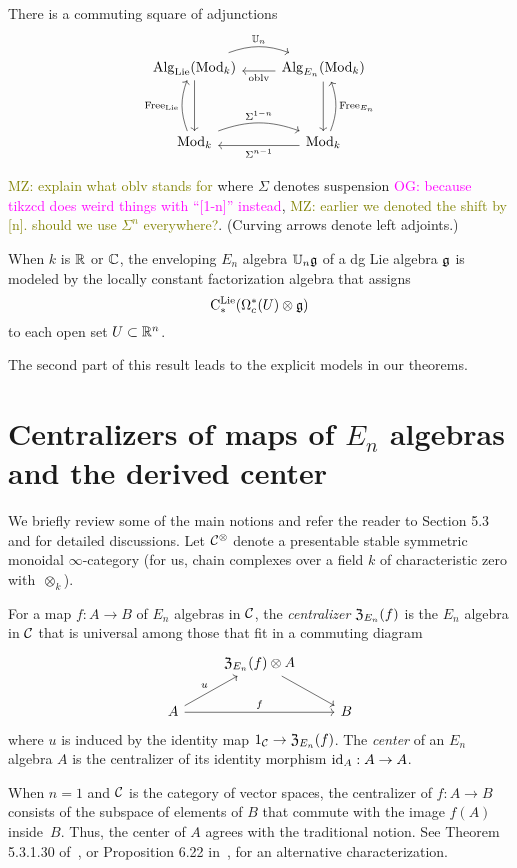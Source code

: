 \documentclass[11pt]{amsart}
\numberwithin{equation}{section}
\def\owen{\textcolor{magenta}{OG: }\textcolor{magenta}}
\def\mahmoud{\textcolor{olive}{MZ: }\textcolor{olive}}
\begin{document}
\def\oblv{{\rm oblv}}
\def\Free{{\rm Free}}

\begin{thm}
There is a commuting square of adjunctions
\[
\begin{tikzcd}
\Alg_\Lie(\Mod_k) \arrow[r, bend left=20, shift left=.5ex,"\UU_n"] \arrow[dd] & \Alg_{E_n}(\Mod_k) \arrow[l, shift left=.5ex, "\oblv"] \arrow[dd]\\
&\\
\Mod_k \arrow[r, bend left=20, shift left=.5ex, "\Sigma^{1-n}"] \arrow[uu, bend left=20, shift left=.5ex, "\Free_\Lie"] & \Mod_k \arrow[l, shift left=.5ex,"\Sigma^{n-1}"] \arrow[uu, bend right=20, shift right=.5ex, "\Free_{E_n}"']
\end{tikzcd}
\]

\mahmoud{explain what oblv stands for}
where $\Sigma$ denotes suspension \owen{because tikzcd does weird things with ``[1-n]'' instead}, \mahmoud{earlier we denoted the shift by [n]. should we use $\Sigma^n$ everywhere?}.
(Curving arrows denote left adjoints.)

When $k$ is $\mathbb R$ or $\mathbb C$, 
the enveloping $E_n$ algebra $\mathbb U_n \mathfrak g$ of a dg Lie algebra $\mathfrak g$ is modeled by the locally constant factorization algebra that assigns
\[
{\rm C}^{\rm Lie}_*(\Omega^*_c(U) \otimes \mathfrak g)
\]
to each open set $U \subset \mathbb R^n$.
\end{thm}

The second part of this result leads to the explicit models in our theorems.

\section{Centralizers of maps of $E_n$ algebras and the derived center}
\label{sec: centralizer}

We briefly review some of the main notions and refer the reader to \cite{LurieHA} Section 5.3 and \cite{FrancisHH} for detailed discussions. Let $\mathcal C^\otimes$ denote a presentable stable symmetric monoidal $\infty$-category (for us, chain complexes over a field $k$ of characteristic zero with~$\otimes_k$).

\begin{dfn}
For a map $f: A \to B$ of $E_n$ algebras in $\mathcal C$, 
the {\em centralizer} ${\frak Z}_{E_n}(f)$ is the $E_n$ algebra in $\mathcal C$ that is universal among those that fit in a commuting diagram
\[
\begin{tikzcd}
& {\frak Z}_{E_n}(f) \otimes A \arrow[dr] & \\
A \arrow[ur, "u"] \arrow[rr, "f"] && B
\end{tikzcd}
\]
where $u$ is induced by the identity map $1_\mathcal C \to {\frak Z}_{E_n}(f)$. The {\em center} of an $E_n$ algebra $A$ is the centralizer of its identity morphism ${\rm id}_A: A \to A$.
\end{dfn}
When $n=1$ and $\mathcal C$ is the category of vector spaces, the centralizer of $f: A \to B$ consists of the subspace of elements of $B$ that commute with the image $f(A)$ inside~$B$. Thus, the center of $A$ agrees with the traditional notion. See Theorem 5.3.1.30 of~\cite{LurieHA}, or Proposition 6.22 in~\cite{GTZ3}, for an alternative characterization.
\end{document}
